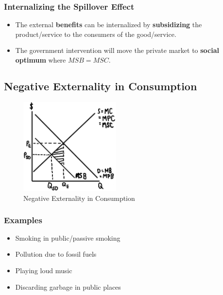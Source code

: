 \documentclass[
  letterpaper,
  DIV=11,
  numbers=noendperiod]{scrartcl}
\providecommand{\tightlist}{%
  \setlength{\itemsep}{0pt}\setlength{\parskip}{0pt}}\usepackage{longtable,booktabs,array}
\begin{document}
\subsubsection{Internalizing the Spillover
Effect}\label{internalizing-the-spillover-effect}

\begin{itemize}
\tightlist
\item
  The external \textbf{benefits} can be internalized by
  \textbf{subsidizing} the product/service to the consumers of the
  good/service.
\item
  The government intervention will move the private market to
  \textbf{social optimum} where \(MSB = MSC\).
\end{itemize}

\newpage{}

\subsection{Negative Externality in
Consumption}\label{negative-externality-in-consumption}

\begin{figure}[H]

{\centering \includegraphics[width=0.45\textwidth,height=\textheight]{img/neg-cons.png}

}

\caption{Negative Externality in Consumption}

\end{figure}%

\subsubsection{Examples}\label{examples-3}

\begin{itemize}
\tightlist
\item
  Smoking in public/passive smoking
\item
  Pollution due to fossil fuels
\item
  Playing loud music
\item
  Discarding garbage in public places
\end{itemize}
\end{document}
